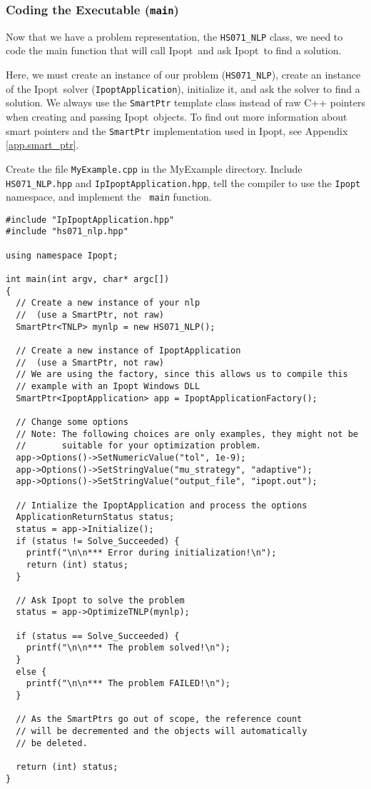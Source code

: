 \documentclass[10pt]{article}
\newcommand{\Ipopt}{{\sc Ipopt}}
\begin{document}
\subsubsection{Coding the Executable (\texttt{main})}
Now that we have a problem representation, the {\tt HS071\_NLP} class,
we need to code the main function that will call \Ipopt\ and ask \Ipopt\
to find a solution.

Here, we must create an instance of our problem ({\tt HS071\_NLP}),
create an instance of the \Ipopt\ solver (\texttt{IpoptApplication}),
initialize it, and ask the solver to find a solution. We always use
the \texttt{SmartPtr} template class instead of raw C++ pointers when
creating and passing \Ipopt\ objects. To find out more information
about smart pointers and the {\tt SmartPtr} implementation used in
\Ipopt, see Appendix \ref{app.smart_ptr}.

Create the file {\tt MyExample.cpp} in the MyExample directory.
Include {\tt HS071\_NLP.hpp} and {\tt IpIpoptApplication.hpp}, tell
the compiler to use the {\tt Ipopt} namespace, and implement the {\tt
  main} function.

\begin{footnotesize}
\begin{verbatim}
#include "IpIpoptApplication.hpp"
#include "hs071_nlp.hpp"

using namespace Ipopt;

int main(int argv, char* argc[])
{
  // Create a new instance of your nlp 
  //  (use a SmartPtr, not raw)
  SmartPtr<TNLP> mynlp = new HS071_NLP();

  // Create a new instance of IpoptApplication
  //  (use a SmartPtr, not raw)
  // We are using the factory, since this allows us to compile this
  // example with an Ipopt Windows DLL
  SmartPtr<IpoptApplication> app = IpoptApplicationFactory();

  // Change some options
  // Note: The following choices are only examples, they might not be
  //       suitable for your optimization problem.
  app->Options()->SetNumericValue("tol", 1e-9);
  app->Options()->SetStringValue("mu_strategy", "adaptive");
  app->Options()->SetStringValue("output_file", "ipopt.out");

  // Intialize the IpoptApplication and process the options
  ApplicationReturnStatus status;
  status = app->Initialize();
  if (status != Solve_Succeeded) {
    printf("\n\n*** Error during initialization!\n");
    return (int) status;
  }

  // Ask Ipopt to solve the problem
  status = app->OptimizeTNLP(mynlp);

  if (status == Solve_Succeeded) {
    printf("\n\n*** The problem solved!\n");
  }
  else {
    printf("\n\n*** The problem FAILED!\n");
  }

  // As the SmartPtrs go out of scope, the reference count
  // will be decremented and the objects will automatically 
  // be deleted.

  return (int) status;
}
\end{verbatim} 
\end{footnotesize}
\end{document}
